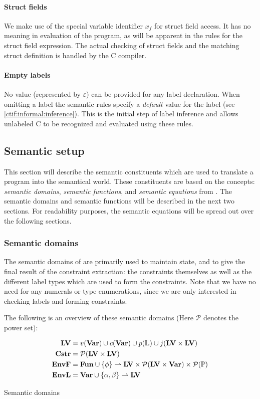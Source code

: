 \paragraph{Struct fields}
We make use of the special variable identifier $x_f$ for struct field access.
It has no meaning in evaluation of the program, as will be apparent in the rules for the struct field expression.
The actual checking of struct fields and the matching struct definition is handled by the C compiler.

\paragraph{Empty labels}
No value (represented by $\varepsilon$) can be provided for any label declaration.
When omitting a label the semantic rules specify a \textit{default} value for the label (see \cref{ctif:informal:inference}).
This is the initial step of label inference and allows unlabeled C to be recognized and evaluated using these rules.

\subsection{Semantic setup}
This section will describe the semantic constituents which are used to translate a \thelang{} program into the semantical world.
These constituents are based on the concepts: \emph{semantic domains}, \emph{semantic functions}, and \emph{semantic equations} from \cite[Chapter 9]{slonneger1995formal}.
The semantic domains and semantic functions will be described in the next two sections.
For readability purposes, the semantic equations will be spread out over the following sections.

\subsubsection{Semantic domains}
The semantic domains of \thelang{} are primarily used to maintain state, and to give the final result of the constraint extraction: the constraints themselves as well as the different label types which are used to form the constraints.
Note that we have no need for any numerals or type enumerations, since we are only interested in checking labels and forming constraints.

The following is an overview of these semantic domains (Here $\mathcal P$ denotes the power set):
\begin{table}[H]
\begin{align*}
\mathbf{LV}    & = v(\mathbf{Var}) \cup c(\mathbf{Var}) \cup p(\mathbb{L}) \cup j(\mathbf{LV} \times \mathbf{LV}) \\
\mathbf{Cstr}  & = \mathcal P (\mathbf{LV} \times \mathbf{LV}) \\
\mathbf{EnvF}  & = \mathbf{Fun} \cup \{ \phi \} \rightharpoonup \mathbf{LV} \times \mathcal P (\mathbf{LV} \times \mathbf{Var}) \times \mathcal P(\mathbb{P}) \\
\mathbf{EnvL}  & = \mathbf{Var} \cup \{ \alpha, \beta \} \rightharpoonup \mathbf{LV}
\end{align*}
\caption{Semantic domains}
\label{cstr:semantic_domains}
\end{table}

